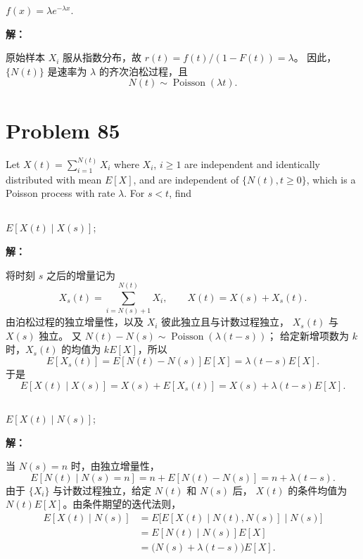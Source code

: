 \documentclass[12pt,a4paper]{article}
\begin{document}
$f(x) = \lambda e^{-\lambda x}$.

\begin{answerbox}
\textbf{解：}

原始样本 $X_i$ 服从指数分布，故 $r(t)=f(t)/(1-F(t))=\lambda$。
因此，$\{N(t)\}$ 是速率为 $\lambda$ 的齐次泊松过程，且
$$
N(t) \sim \operatorname{Poisson}(\lambda t).
$$

\end{answerbox}


\clearpage
\section{Problem 85}

Let $X(t) = \sum_{i=1}^{N(t)} X_i$ where $X_i$, $i \ge 1$ are independent
and identically distributed with mean $E[X]$, and are independent of
$\{N(t), t \ge 0\}$, which is a Poisson process with rate $\lambda$.
For $s < t$, find

\subsection{}

$E[X(t) \mid X(s)]$;

\begin{answerbox}
\textbf{解：}

将时刻 $s$ 之后的增量记为
$$
X_s(t)=\sum_{i=N(s)+1}^{N(t)}X_i,
\qquad X(t)=X(s)+X_s(t).
$$
由泊松过程的独立增量性，以及 $X_i$ 彼此独立且与计数过程独立，
$X_s(t)$ 与 $X(s)$ 独立。
又 $N(t)-N(s)\sim\operatorname{Poisson}(\lambda(t-s))$；
给定新增项数为 $k$ 时，$X_s(t)$ 的均值为 $kE[X]$，所以
$$
E[X_s(t)]=E[N(t)-N(s)]E[X]=\lambda(t-s)E[X].
$$
于是
$$
E[X(t)\mid X(s)]
=X(s)+E[X_s(t)]
=X(s)+\lambda(t-s)E[X].
$$

\end{answerbox}

\subsection{}

$E[X(t) \mid N(s)]$;

\begin{answerbox}
\textbf{解：}

当 $N(s)=n$ 时，由独立增量性，
$$
E[N(t)\mid N(s)=n]
=n+E[N(t)-N(s)]
=n+\lambda(t-s).
$$
由于 $\{X_i\}$ 与计数过程独立，给定 $N(t)$ 和 $N(s)$ 后，
$X(t)$ 的条件均值为 $N(t)E[X]$。由条件期望的迭代法则，
$$
\begin{aligned}
E[X(t)\mid N(s)]
&=E\bigl[E[X(t)\mid N(t),N(s)]\mid N(s)\bigr]\\
&=E[N(t)\mid N(s)]E[X]\\
&=\bigl(N(s)+\lambda(t-s)\bigr)E[X].
\end{aligned}
$$


\end{answerbox}
\end{document}
